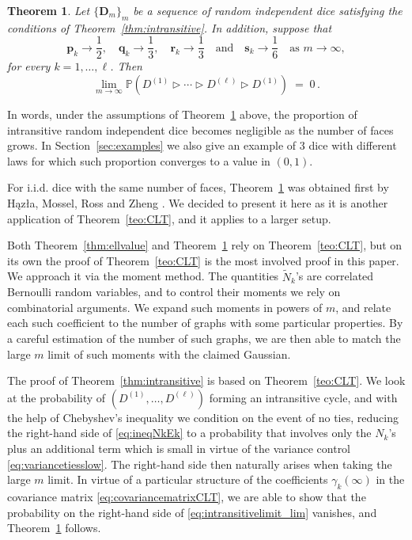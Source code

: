 \documentclass[reqno,a4paper,11pt]{amsart}
\newcommand{\btt}{\triangleright}
\newtheorem{theorem}[lemma]{Theorem}
\theoremstyle{remark}
\newcommand{\mb}[1]{{\mathbf #1}}
\newcommand{\bb}[1]{{\mathbb #1}}
\newcommand{\wt}[1]{{\widetilde{#1}}}
\numberwithin{equation}{section}
\begin{document}
\begin{theorem}\label{thm:nointransitive}
Let $\{\mb D_m\}_m$ be a sequence of random independent dice satisfying the
conditions of Theorem~\ref{thm:intransitive}. In addition, suppose that
%
\begin{equation}\label{eq:assumptionpqrssym}
\mb p_k\to \frac{1}{2},\quad \mb q_k \to \frac{1}{3}, \quad \mb r_k\to \frac{1}{3} \quad \text{and}\quad \mb s_k\to \frac{1}{6} \quad \text{as }m \to \infty,
\end{equation}
%
for every $k=1,\hdots, \ell$. Then
%
$$
\lim_{m\to \infty}\bb P\left({D^{(1)} \btt \cdots \btt D^{(\ell)} \btt D^{(1)}}\right)\;=\;0\,.
$$
\end{theorem}
In words, under the assumptions of Theorem~\ref{thm:nointransitive} above, the proportion of intransitive random independent dice becomes negligible as the number of faces grows.
In Section~\ref{sec:examples} we also give an example of 3 dice with different laws for which such proportion converges to a value in $(0,1)$.

For i.i.d. dice with the same number of faces, Theorem~\ref{thm:nointransitive} was obtained first by H\k{a}z{\l}a, Mossel, Ross and Zheng \cite[Theorem~6]{PTRF}. We decided to present it here as it is another application of Theorem~\ref{teo:CLT}, and it applies to a larger setup.

Both Theorem~\ref{thm:ellvalue} and Theorem~\ref{thm:nointransitive} rely on Theorem~\ref{teo:CLT}, but on its own the proof of Theorem~\ref{teo:CLT} is the most involved proof in this paper. We approach it via the moment method. The quantities $\wt N_k$'s are correlated Bernoulli random variables, and to control their moments we rely on combinatorial arguments. We expand such moments in powers of $m$, and relate each such coefficient to the number of graphs with some particular properties. By a careful estimation of the number of such graphs, we are then able to match the large $m$ limit of such moments with the claimed Gaussian.



The proof of Theorem~\ref{thm:intransitive} is based on Theorem~\ref{teo:CLT}.
We look at the probability of $(D^{(1)}, \ldots, D^{(\ell)})$ forming an
intransitive cycle, and with the help of Chebyshev's inequality we condition on the event of no ties, reducing the right-hand side of \eqref{eq:ineqNkEk} to a probability that involves only the $N_k$'s plus an additional term which is small in virtue of the variance control \eqref{eq:variancetiesslow}. The right-hand side then naturally arises when taking the large $m$ limit.
In virtue of a particular structure of the coefficients $\gamma_k(\infty)$ in
the covariance matrix \eqref{eq:covariancematrixCLT}, we are able to show that
the probability on the right-hand side of \eqref{eq:intransitivelimit_lim} vanishes, and Theorem~\ref{thm:nointransitive} follows.
\end{document}
